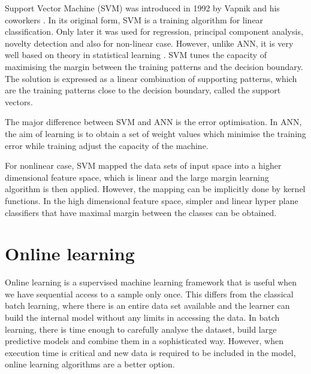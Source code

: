 Support Vector Machine (SVM) was introduced in 1992 by Vapnik and his coworkers
\cite{boser1992}. In its original form, SVM is a training algorithm for linear classification. Only later it was used for regression, principal component analysis, novelty detection and also for non-linear case.  However, unlike ANN, it is very well 
based on theory in statistical learning \cite{cortes1995}.  SVM tunes the capacity of 
maximising the margin between the training patterns and the decision boundary. The
solution is expressed as a linear combination of supporting patterns, which are the training patterns close to the decision boundary, called the support vectors.

The major difference between SVM and ANN is the error optimisation. In ANN, the aim of learning is to obtain a set of weight values which minimise the training error while training adjust the capacity of the machine.

For nonlinear case, SVM mapped the data sets of input space into a higher dimensional feature space, which is linear and the large margin learning algorithm is then applied. However, the mapping can be implicitly done by kernel functions. In the high dimensional feature space, simpler and linear hyper plane classifiers that have maximal margin between the classes can be obtained.

\newpage
\section{Online learning} \label{sec:onoffline}

Online learning is a supervised machine learning framework that is useful when
we have sequential access to a sample only once.  This differs from the
classical batch learning, where there is an entire data set available and the
learner can build the internal model without any limits in accessing the data.
In batch learning, there is time enough to carefully analyse the dataset, build
large predictive models and combine them in a sophisticated way. However, when
execution time is critical and new data is required to be included in the model,
online learning algorithms are a better option.


